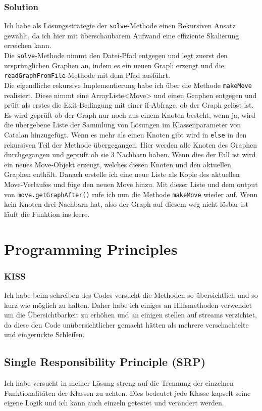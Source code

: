 \documentclass[12pt,a4paper]{article}
\begin{document}
\subsubsection{Solution}
Ich habe als Lösungsstrategie der \texttt{solve}-Methode einen Rekursiven Ansatz gewählt, da ich hier mit überschaubarem Aufwand eine effiziente Skalierung erreichen kann.\\
Die \texttt{solve}-Methode nimmt den Datei-Pfad entgegen und legt zuerst den ursprünglichen Graphen an, indem es ein neuen Graph erzeugt und die \texttt{readGraphFromFile}-Methode mit dem Pfad ausführt.\\
Die eigendliche rekursive Implementierung habe ich über die Methode \texttt{makeMove} realisiert. Diese nimmt eine ArrayListe<Move> und einen Graphen entgegen und prüft als erstes die Exit-Bedingung mit einer if-Abfrage, ob der Graph gelöst ist. Es wird geprüft ob der Graph nur noch aus einem Knoten besteht, wenn ja, wird die übergebene Liste der \glqq Sammlung\grqq{} von Lösungen im Klassenparameter von Catalan hinzugefügt. Wenn es mehr als einen Knoten gibt wird in \texttt{else} in den rekursiven Teil der Methode übergegangen. Hier werden alle Knoten des Graphen durchgegangen und geprüft ob sie 3 Nachbarn haben. Wenn dies der Fall ist wird ein neues Move-Objekt erzeugt, welches diesen Knoten und den aktuellen Graphen enthält. Danach erstelle ich eine neue Liste als Kopie des aktuellen Move-Verlaufes und füge den neuen Move hinzu. Mit dieser Liste und dem output von \texttt{move.getGraphAfter()} rufe ich nun die Methode \texttt{makeMove} wieder auf. Wenn kein Knoten drei Nachbarn hat, also der Graph auf diesem weg nicht lösbar ist läuft die Funktion ins leere.

\section{Programming Principles}
\subsubsection*{KISS}
Ich habe beim schreiben des Codes versucht die Methoden so übersichtlich und so kurz wie möglich zu halten. Daher habe ich einiges an Hilfsmethoden verwendet um die Übersichtbarkeit zu erhöhen und an einigen stellen auf streams verzichtet, da diese den Code unübersichtlicher gemacht hätten als mehrere verschachtelte und eingerückte Schleifen.

\subsection*{Single Responsibility Principle (SRP)}
Ich habe versucht in meiner Lösung streng auf die Trennung der einzelnen Funktionalitäten der Klassen zu achten. Dies bedeutet jede Klasse kapselt seine eigene Logik und ich kann auch einzeln getestet und verändert werden.
\end{document}
